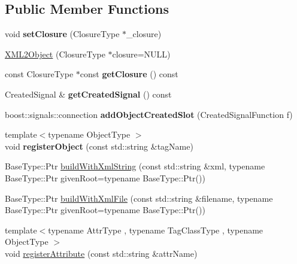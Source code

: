 \subsection*{Public Member Functions}
\begin{DoxyCompactItemize}
\item 
\hypertarget{classsambag_1_1xml_1_1_x_m_l2_object_a2b058ada4c3e0cd2a23a4e945a708e45}{
void {\bfseries setClosure} (ClosureType $\ast$\_\-closure)}
\label{classsambag_1_1xml_1_1_x_m_l2_object_a2b058ada4c3e0cd2a23a4e945a708e45}

\item 
\hyperlink{classsambag_1_1xml_1_1_x_m_l2_object_aa29cc2faf47f065c48aea6d8c2295002}{XML2Object} (ClosureType $\ast$closure=NULL)
\item 
\hypertarget{classsambag_1_1xml_1_1_x_m_l2_object_a1341964c71a82a89644c5fa2532dedd1}{
const ClosureType $\ast$const {\bfseries getClosure} () const }
\label{classsambag_1_1xml_1_1_x_m_l2_object_a1341964c71a82a89644c5fa2532dedd1}

\item 
\hypertarget{classsambag_1_1xml_1_1_x_m_l2_object_a0519b768171680ec22540d4501ddfdc4}{
CreatedSignal \& {\bfseries getCreatedSignal} () const }
\label{classsambag_1_1xml_1_1_x_m_l2_object_a0519b768171680ec22540d4501ddfdc4}

\item 
\hypertarget{classsambag_1_1xml_1_1_x_m_l2_object_a88230eac8b5170e9a9fe11e75ae5d5ef}{
boost::signals::connection {\bfseries addObjectCreatedSlot} (CreatedSignalFunction f)}
\label{classsambag_1_1xml_1_1_x_m_l2_object_a88230eac8b5170e9a9fe11e75ae5d5ef}

\item 
\hypertarget{classsambag_1_1xml_1_1_x_m_l2_object_a83f2d6c64778350de56f5ac806c0862f}{
{\footnotesize template$<$typename ObjectType $>$ }\\void {\bfseries registerObject} (const std::string \&tagName)}
\label{classsambag_1_1xml_1_1_x_m_l2_object_a83f2d6c64778350de56f5ac806c0862f}

\item 
BaseType::Ptr \hyperlink{classsambag_1_1xml_1_1_x_m_l2_object_a8f90af1990f3043b68d5cd606cfd3b9d}{buildWithXmlString} (const std::string \&xml, typename BaseType::Ptr givenRoot=typename BaseType::Ptr())
\item 
BaseType::Ptr \hyperlink{classsambag_1_1xml_1_1_x_m_l2_object_a2e2376841f95b0aed23a90ebdecd69e9}{buildWithXmlFile} (const std::string \&filename, typename BaseType::Ptr givenRoot=typename BaseType::Ptr())
\item 
{\footnotesize template$<$typename AttrType , typename TagClassType , typename ObjectType $>$ }\\void \hyperlink{classsambag_1_1xml_1_1_x_m_l2_object_a598fc8426cf32faf5a8cdacead3b404a}{registerAttribute} (const std::string \&attrName)
\end{DoxyCompactItemize}
